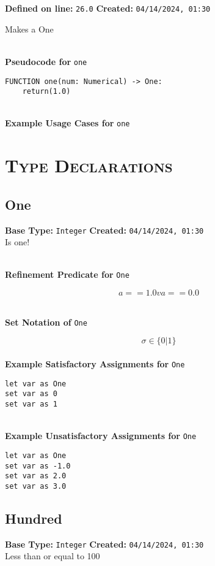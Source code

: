 \documentclass{article}
\begin{document}
\textbf{Defined on line:} \verb|26.0| \hfill \textbf{Created:} \verb|04/14/2024, 01:30| 


Makes a One

\textbf{\\ Pseudocode for } \texttt{one}
\begin{verbatim}
FUNCTION one(num: Numerical) -> One:
	return(1.0)
\end{verbatim}

\textbf{\\ Example Usage Cases for } \texttt{one}
\clearpage

\section{\textsc{Type Declarations}}

\subsection{One}
\textbf{Base Type:} \verb|Integer| \hfill \textbf{Created:} \verb|04/14/2024, 01:30| \\
Is one!

\textbf{\\ Refinement Predicate for } \texttt{One}

$$ a == 1.0 v a == 0.0 $$

\textbf{\\ Set Notation of } \texttt{One}

$$\sigma \in \{ 0 | 1 \}$$ \ \
\textbf{\\ Example Satisfactory Assignments for } \texttt{One}
\begin{verbatim}
let var as One
set var as 0
set var as 1
\end{verbatim}


\textbf{\\ Example Unsatisfactory Assignments for } \texttt{One}
\begin{verbatim}
let var as One
set var as -1.0
set var as 2.0
set var as 3.0
\end{verbatim}


\clearpage

\subsection{Hundred}
\textbf{Base Type:} \verb|Integer| \hfill \textbf{Created:} \verb|04/14/2024, 01:30| \\
Less than or equal to 100
\end{document}
